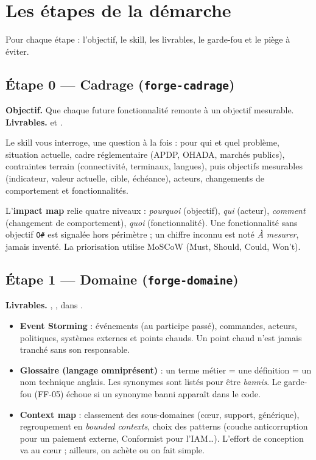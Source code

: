 \chapter{Les étapes de la démarche}
Pour chaque étape : l'objectif, le skill, les livrables, le garde-fou et le piège à éviter.

\section{Étape 0 --- Cadrage (\texttt{forge-cadrage})}
\textbf{Objectif.} Que chaque future fonctionnalité remonte à un objectif mesurable.\\
\textbf{Livrables.}  et .

Le skill vous interroge, une question à la fois : pour qui et quel problème, situation actuelle, cadre réglementaire (APDP, OHADA, marchés publics), contraintes terrain (connectivité, terminaux, langues), puis objectifs mesurables (indicateur, valeur actuelle, cible, échéance), acteurs, changements de comportement et fonctionnalités.

L'\textbf{impact map} relie quatre niveaux : \emph{pourquoi} (objectif), \emph{qui} (acteur), \emph{comment} (changement de comportement), \emph{quoi} (fonctionnalité). Une fonctionnalité sans objectif \texttt{O\#} est signalée hors périmètre ; un chiffre inconnu est noté \emph{À mesurer}, jamais inventé. La priorisation utilise MoSCoW (Must, Should, Could, Won't).


\section{Étape 1 --- Domaine (\texttt{forge-domaine})}
\textbf{Livrables.} , ,  dans .

\begin{itemize}
  \item \textbf{Event Storming} : événements (au participe passé), commandes, acteurs, politiques, systèmes externes et points chauds. Un point chaud n'est jamais tranché sans son responsable.
  \item \textbf{Glossaire (langage omniprésent)} : un terme métier = une définition = un nom technique anglais. Les synonymes sont listés pour être \emph{bannis}. Le garde-fou  (FF-05) échoue si un synonyme banni apparaît dans le code.
  \item \textbf{Context map} : classement des sous-domaines (cœur, support, générique), regroupement en \emph{bounded contexts}, choix des patterns (couche anticorruption pour un paiement externe, Conformist pour l'IAM\dots). L'effort de conception va au cœur ; ailleurs, on achète ou on fait simple.
\end{itemize}

